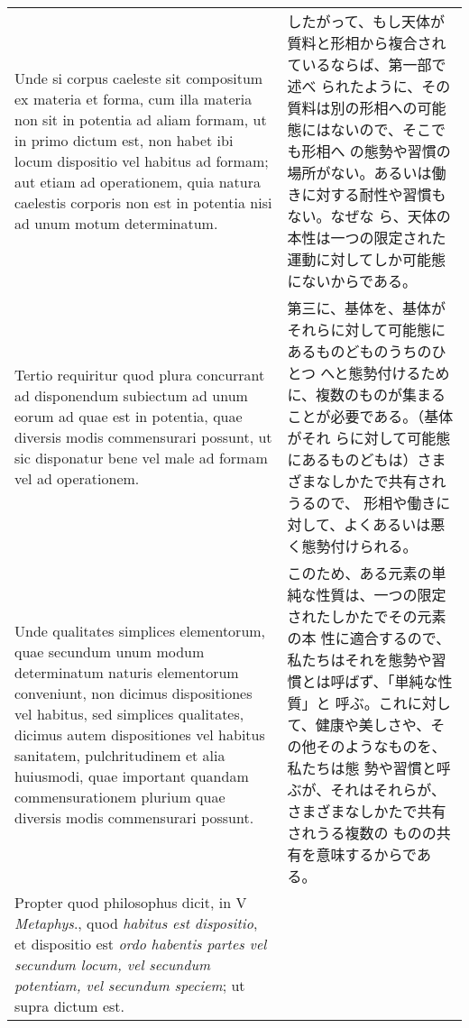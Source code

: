 \documentclass[10pt]{jsarticle} %
\begin{document}
\begin{longtable}{p{21em}p{21em}}
\\

Unde si corpus
caeleste sit compositum ex materia et forma, cum illa materia non sit
in potentia ad aliam formam, ut in primo dictum est, non habet ibi
locum dispositio vel habitus ad formam; aut etiam ad operationem, quia
natura caelestis corporis non est in potentia nisi ad unum motum
determinatum. 

&

したがって、もし天体が質料と形相から複合されているならば、第一部で述べ
られたように、その質料は別の形相への可能態にはないので、そこでも形相へ
の態勢や習慣の場所がない。あるいは働きに対する耐性や習慣もない。なぜな
ら、天体の本性は一つの限定された運動に対してしか可能態にないからである。

\\

Tertio requiritur quod plura concurrant ad disponendum
subiectum ad unum eorum ad quae est in potentia, quae diversis modis
commensurari possunt, ut sic disponatur bene vel male ad formam vel ad
operationem. 

&

第三に、基体を、基体がそれらに対して可能態にあるものどものうちのひとつ
へと態勢付けるために、複数のものが集まることが必要である。（基体がそれ
らに対して可能態にあるものどもは）さまざまなしかたで共有されうるので、
形相や働きに対して、よくあるいは悪く態勢付けられる。

\\

Unde qualitates simplices elementorum, quae secundum unum
modum determinatum naturis elementorum conveniunt, non dicimus
dispositiones vel habitus, sed simplices qualitates, dicimus autem
dispositiones vel habitus sanitatem, pulchritudinem et alia huiusmodi,
quae important quandam commensurationem plurium quae diversis modis
commensurari possunt. 

&

このため、ある元素の単純な性質は、一つの限定されたしかたでその元素の本
性に適合するので、私たちはそれを態勢や習慣とは呼ばず、「単純な性質」と
呼ぶ。これに対して、健康や美しさや、その他そのようなものを、私たちは態
勢や習慣と呼ぶが、それはそれらが、さまざまなしかたで共有されうる複数の
ものの共有を意味するからである。

\\

Propter quod philosophus dicit, in V {\itshape Metaphys}.,
quod {\itshape habitus est dispositio}, et dispositio est {\itshape ordo habentis partes
vel secundum locum, vel secundum potentiam, vel secundum speciem}; ut
supra dictum est. 


\end{longtable}
\end{document}
